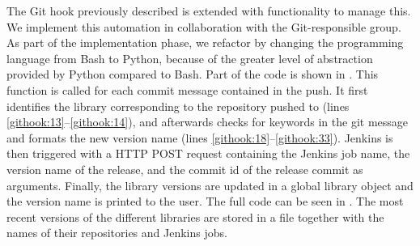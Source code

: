 The Git hook previously described is extended with functionality to manage this. We implement this automation in collaboration with the Git-responsible group. As part of the implementation phase, we refactor by changing the programming language from Bash to Python, because of the greater level of abstraction provided by Python compared to Bash. Part of the code is shown in . This function is called for each commit message contained in the push. It first identifies the library corresponding to the repository pushed to (lines \ref{githook:13}--\ref{githook:14}), and afterwards checks for keywords in the git message and formats the new version name (lines \ref{githook:18}--\ref{githook:33}). Jenkins is then triggered with a HTTP POST request containing the Jenkins job name, the version name of the release, and the commit id of the release commit as arguments. Finally, the library versions are updated in a global library object and the version name is printed to the user. The full code can be seen in . The most recent versions of the different libraries are stored in a file together with the names of their repositories and Jenkins jobs.

